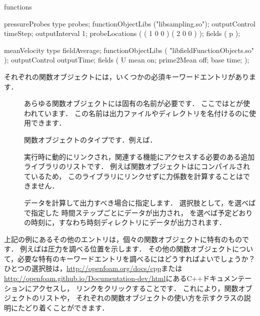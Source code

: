 \begin{OFverbatim}[file]
functions
{
    pressureProbes
    {
        type            probes;
        functionObjectLibs ("libsampling.so");
        outputControl   timeStep;
        outputInterval  1;
        probeLocations
        (
            ( 1 0 0 )
            ( 2 0 0 )
        );
        fields
        (
            p
        );
    }

    meanVelocity
    {
        type            fieldAverage;
        functionObjectLibs ( "libfieldFunctionObjects.so" );
        outputControl   outputTime;
        fields
        (
            U
            {
                mean        on;
                prime2Mean  off;
                base        time;
            }
        );
    }
}
\end{OFverbatim}

それぞれの関数オブジェクトには，いくつかの必須キーワードエントリがあります．
\begin{description}
 \item[]
            あらゆる関数オブジェクトには固有の名前が必要です．
            ここではとが使われています．
            この名前は出力ファイルやディレクトリを名付けるのに使用できます．
 \item[]
            関数オブジェクトのタイプです．例えば．
 \item[]
            実行時に動的にリンクされ，関連する機能にアクセスする必要のある追加ライブラリのリストです．
            例えば関数オブジェクトはにコンパイルされているため，
            このライブラリにリンクせずに力係数を計算することはできません．
 \item[]
            データを計算して出力すべき場合に指定します．
            選択肢として，を選べばで指定した
            時間ステップごとにデータが出力され，
            を選べば予定どおりの時刻に，すなわち時刻ディレクトリにデータが出力されます．
\end{description}

上記の例にあるその他のエントリは，個々の関数オブジェクトに特有のものです．
例えばは圧力を調べる位置を示します．
その他の関数オブジェクトについて，必要な特有のキーワードエントリを調べるにはどうすればよいでしょうか？
ひとつの選択肢は，\url{http://openfoam.org/docs/cpp}または
\url{http://openfoam.github.io/Documentation-dev/html}にあるC++ドキュメンテーションにアクセスし，
リンクをクリックすることです．
これにより，関数オブジェクトのリストや，
それぞれの関数オブジェクトの使い方を示すクラスの説明にたどり着くことができます．


